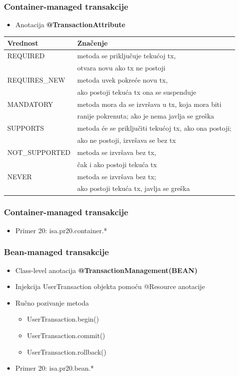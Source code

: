 \documentclass[compress]{beamer}
\begin{document}
\begin{frame}
  \frametitle{Container-managed transakcije}
  \begin{itemize}
    \item Anotacija {\bf @TransactionAttribute}
  \end{itemize}
  \small{
  \begin{tabular}{l|l}
    \textbf{Vrednost} & \textbf{Značenje} \\ \hline
    REQUIRED & metoda se priključuje tekućoj tx, \\
      & otvara novu ako tx ne postoji \\ \hline
    REQUIRES\_NEW & metoda uvek pokreće novu tx, \\
      & ako postoji tekuća tx ona se suspenduje \\ \hline
    MANDATORY & metoda mora da se izvršava u tx, koja mora biti \\
      & ranije pokrenuta; ako je nema javlja se greška \\ \hline
    SUPPORTS & metoda će se priključiti tekućoj tx, ako ona postoji; \\ 
      & ako ne postoji, izvršava se bez tx \\ \hline
    NOT\_SUPPORTED & metoda se izvršava bez tx, \\ 
      & čak i ako postoji tekuća tx \\ \hline
    NEVER & metoda se izvršava bez tx; \\
      & ako postoji tekuća tx, javlja se greška
  \end{tabular}
  }
\end{frame}
\begin{frame}
  \frametitle{Container-managed transakcije}
  \begin{itemize}
    \item Primer 20: isa.pr20.container.*
  \end{itemize}
\end{frame}
\begin{frame}
  \frametitle{Bean-managed transakcije}
  \begin{itemize}
    \item Class-level anotacija \textbf{@TransactionManagement(BEAN)}
    \item Injekcija UserTransaction objekta pomoću @Resource anotacije
    \item Ručno pozivanje metoda
    \begin{itemize}
      \item UserTransaction.begin()
      \item UserTransaction.commit()
      \item UserTransaction.rollback()
    \end{itemize}
    \item Primer 20: isa.pr20.bean.*
  \end{itemize}
\end{frame}
\end{document}
